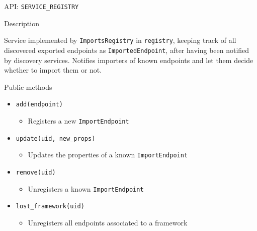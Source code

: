 \begin{frame}{API: \texttt{SERVICE\_REGISTRY}}
\begin{block}{Description}
\begin{small}
Service implemented by \texttt{ImportsRegistry} in \texttt{registry},
keeping track of all discovered exported endpoints as \texttt{ImportedEndpoint}, after having been notified by discovery services.
Notifies importers of known endpoints and let them decide whether to import them or not.
\end{small}
\end{block}

\begin{block}{Public methods}
\begin{small}
\begin{itemize}
\vspace{-.2em}
\item[] \texttt{add(endpoint)}
\begin{itemize}
\vspace{-.5em}
\item[] Registers a new \texttt{ImportEndpoint}
\end{itemize}
\vspace{-.2em}
\item[] \texttt{update(uid, new\_props)}
\begin{itemize}
\vspace{-.5em}
\item[] Updates the properties of a known \texttt{ImportEndpoint}
\end{itemize}
\vspace{-.2em}
\item[] \texttt{remove(uid)}
\begin{itemize}
\vspace{-.5em}
\item[] Unregisters a known \texttt{ImportEndpoint}
\end{itemize}
\vspace{-.2em}
\item[] \texttt{lost\_framework(uid)}
\begin{itemize}
\vspace{-.5em}
\item[] Unregisters all endpoints associated to a framework
\end{itemize}
\end{itemize}
\end{small}
\end{block}
\end{frame}

